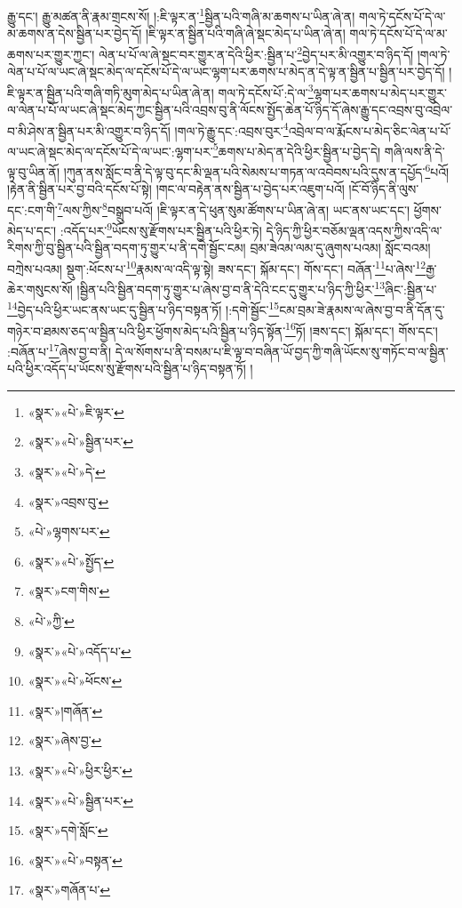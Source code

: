 རྒྱུ་དང་། རྒྱུ་མཚན་ནི་རྣམ་གྲངས་སོ། །:ཇི་ལྟར་ན་\footnote{«སྣར་»«པེ་»ཇི་ལྟར་}སྦྱིན་པའི་གཞི་མ་ཆགས་པ་ཡིན་ཞེ་ན། གལ་ཏེ་དངོས་པོ་དེ་ལ་མ་ཆགས་ན་དེས་སྦྱིན་པར་བྱེད་དོ། །ཇི་ལྟར་ན་སྦྱིན་པའི་གཞི་ཞེ་སྡང་མེད་པ་ཡིན་ཞེ་ན། གལ་ཏེ་དངོས་པོ་དེ་ལ་མ་ཆགས་པར་གྱུར་ཀྱང་། ལེན་པ་པོ་ལ་ཞེ་སྡང་བར་གྱུར་ན་དེའི་ཕྱིར་:སྦྱིན་པ་\footnote{«སྣར་»«པེ་»སྦྱིན་པར་}བྱེད་པར་མི་འགྱུར་བ་ཉིད་དོ། །གལ་ཏེ་ལེན་པ་པོ་ལ་ཡང་ཞེ་སྡང་མེད་ལ་དངོས་པོ་དེ་ལ་ཡང་ལྷག་པར་ཆགས་པ་མེད་ན་དེ་ལྟ་ན་སྦྱིན་པ་སྦྱིན་པར་བྱེད་དོ། །ཇི་ལྟར་ན་སྦྱིན་པའི་གཞི་གཏི་མུག་མེད་པ་ཡིན་ཞེ་ན། གལ་ཏེ་དངོས་པོ་:དེ་ལ་\footnote{«སྣར་»«པེ་»དེ་}ལྷག་པར་ཆགས་པ་མེད་པར་གྱུར་ལ་ལེན་པ་པོ་ལ་ཡང་ཞེ་སྡང་མེད་ཀྱང་སྦྱིན་པའི་འབྲས་བུ་ནི་ལོངས་སྤྱོད་ཆེན་པོ་ཉིད་དོ་ཞེས་རྒྱུ་དང་འབྲས་བུ་འབྲེལ་བ་མི་ཤེས་ན་སྦྱིན་པར་མི་འགྱུར་བ་ཉིད་དོ། །གལ་ཏེ་རྒྱུ་དང་:འབྲས་བུར་\footnote{«སྣར་»འབྲས་བུ་}འབྲེལ་བ་ལ་རྨོངས་པ་མེད་ཅིང་ལེན་པ་པོ་ལ་ཡང་ཞེ་སྡང་མེད་ལ་དངོས་པོ་དེ་ལ་ཡང་:ལྷག་པར་\footnote{«པེ་»ལྷགས་པར་}ཆགས་པ་མེད་ན་དེའི་ཕྱིར་སྦྱིན་པ་བྱེད་དེ། གཞི་ལས་ནི་དེ་ལྟ་བུ་ཡིན་ནོ། །ཀུན་ནས་སློང་བ་ནི་དེ་ལྟ་བུ་དང་མི་ལྡན་པའི་སེམས་པ་གཏན་ལ་འབེབས་པའི་དུས་ན་དཔྱོད་\footnote{«སྣར་»«པེ་»སྤྱོད་}པའོ། །རྟེན་ནི་སྦྱིན་པར་བྱ་བའི་དངོས་པོ་སྟེ། །གང་ལ་བརྟེན་ནས་སྦྱིན་པ་བྱེད་པར་འཇུག་པའོ། །ངོ་བོ་ཉིད་ནི་ལུས་དང་:ངག་གི་\footnote{«སྣར་»ངག་གིས་}ལས་ཀྱིས་\footnote{«པེ་»ཀྱི་}བསྒྲུབ་པའོ། །ཇི་ལྟར་ན་དེ་ཕུན་སུམ་ཚོགས་པ་ཡིན་ཞེ་ན། ཡང་ནས་ཡང་དང་། ཕྱོགས་མེད་པ་དང་། :འདོད་པར་\footnote{«སྣར་»«པེ་»འདོད་པ་}ཡོངས་སུ་རྫོགས་པར་སྦྱིན་པའི་ཕྱིར་ཏེ། དེ་ཉིད་ཀྱི་ཕྱིར་བཅོམ་ལྡན་འདས་ཀྱིས་འདི་ལ་རིགས་ཀྱི་བུ་སྦྱིན་པའི་སྦྱིན་བདག་ཏུ་གྱུར་པ་ནི་དགེ་སྦྱོང་ངམ། བྲམ་ཟེའམ་ལམ་དུ་ཞུགས་པའམ། སློང་བའམ། བཀྲེས་པའམ། སྡུག་:ཕོངས་པ་\footnote{«སྣར་»«པེ་»ཕོངས་}རྣམས་ལ་འདི་ལྟ་སྟེ། ཟས་དང་། སྐོམ་དང་། གོས་དང་། བཞོན་\footnote{«སྣར་»།གཞོན་}པ་ཞེས་\footnote{«སྣར་»ཞེས་བྱ་}རྒྱ་ཆེར་གསུངས་སོ། །སྦྱིན་པའི་སྦྱིན་བདག་ཏུ་གྱུར་པ་ཞེས་བྱ་བ་ནི་དེའི་ངང་དུ་གྱུར་པ་ཉིད་ཀྱི་ཕྱིར་\footnote{«སྣར་»«པེ་»ཕྱིར་ཕྱིར་}ཞིང་:སྦྱིན་པ་\footnote{«སྣར་»«པེ་»སྦྱིན་པར་}བྱེད་པའི་ཕྱིར་ཡང་ནས་ཡང་དུ་སྦྱིན་པ་ཉིད་བསྟན་ཏོ། །:དགེ་སྦྱོང་\footnote{«སྣར་»དགེ་སློང་}ངམ་བྲམ་ཟེ་རྣམས་ལ་ཞེས་བྱ་བ་ནི་དོན་དུ་གཉེར་བ་ཐམས་ཅད་ལ་སྦྱིན་པའི་ཕྱིར་ཕྱོགས་མེད་པའི་སྦྱིན་པ་ཉིད་སྟོན་\footnote{«སྣར་»«པེ་»བསྟན་}ཏོ། །ཟས་དང་། སྐོམ་དང་། གོས་དང་། :བཞོན་པ་\footnote{«སྣར་»གཞོན་པ་}ཞེས་བྱ་བ་ནི། དེ་ལ་སོགས་པ་ནི་བསམ་པ་ཇི་ལྟ་བ་བཞིན་ཡོ་བྱད་ཀྱི་གཞི་ཡོངས་སུ་གཏོང་བ་ལ་སྦྱིན་པའི་ཕྱིར་འདོད་པ་ཡོངས་སུ་རྫོགས་པའི་སྦྱིན་པ་ཉིད་བསྟན་ཏོ། །
